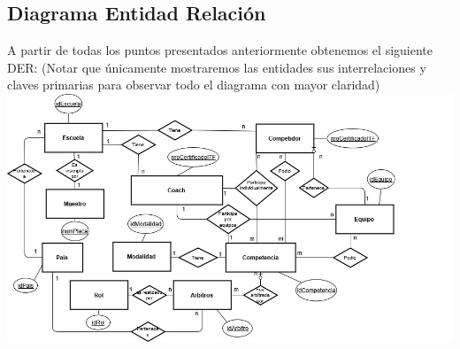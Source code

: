\subsection{Diagrama Entidad Relaci\'on}

A partir de todas los puntos presentados anteriormente obtenemos el siguiente DER: (Notar que únicamente mostraremos las entidades sus interrelaciones y claves primarias para observar todo el diagrama con mayor claridad)\\

\includegraphics[scale=0.55]{der.jpg}
